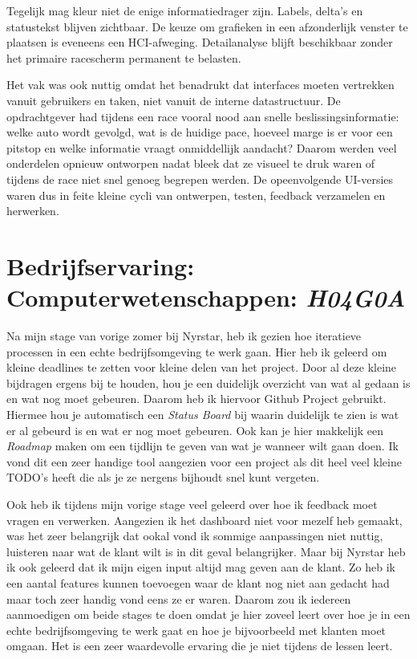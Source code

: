 Tegelijk mag kleur niet de enige informatiedrager zijn. Labels, delta's en statustekst blijven
zichtbaar. De keuze om grafieken in een afzonderlijk venster te plaatsen is eveneens een
HCI-afweging. Detailanalyse blijft beschikbaar zonder het primaire racescherm permanent te belasten.

Het vak was ook nuttig omdat het benadrukt dat interfaces moeten vertrekken vanuit gebruikers en
taken, niet vanuit de interne datastructuur. De opdrachtgever had tijdens een race vooral nood aan
snelle beslissingsinformatie: welke auto wordt gevolgd, wat is de huidige pace, hoeveel marge is er
voor een pitstop en welke informatie vraagt onmiddellijk aandacht? Daarom werden veel onderdelen
opnieuw ontworpen nadat bleek dat ze visueel te druk waren of tijdens de race niet snel genoeg
begrepen werden. De opeenvolgende UI-versies waren dus in feite kleine cycli van ontwerpen, testen,
feedback verzamelen en herwerken.


\section{Bedrijfservaring: Computerwetenschappen: \emph{H04G0A}}
Na mijn stage van vorige zomer bij Nyrstar, heb ik gezien hoe iteratieve processen in een echte bedrijfsomgeving te werk gaan. Hier heb ik geleerd om kleine deadlines te zetten voor kleine delen van het project. Door al deze kleine bijdragen ergens bij te houden, hou je een duidelijk overzicht van wat al gedaan is en wat nog moet gebeuren. Daarom heb ik hiervoor Github Project gebruikt. Hiermee hou je automatisch een \textit{Status Board} bij waarin duidelijk te zien is wat er al gebeurd is en wat er nog moet gebeuren. Ook kan je hier makkelijk een \textit{Roadmap} maken om een tijdlijn te geven van wat je wanneer wilt gaan doen. Ik vond dit een zeer handige tool aangezien voor een project als dit heel veel kleine TODO's heeft die als je ze nergens bijhoudt snel kunt vergeten.

Ook heb ik tijdens mijn vorige stage veel geleerd over hoe ik feedback moet vragen en verwerken. Aangezien ik het dashboard niet voor mezelf heb gemaakt, was het zeer belangrijk dat ookal vond ik sommige aanpassingen niet nuttig, luisteren naar wat de klant wilt is in dit geval belangrijker. Maar bij Nyrstar heb ik ook geleerd dat ik mijn eigen input altijd mag geven aan de klant. Zo heb ik een aantal features kunnen toevoegen waar de klant nog niet aan gedacht had maar toch zeer handig vond eens ze er waren. Daarom zou ik iedereen aanmoedigen om beide stages te doen omdat je hier zoveel leert over hoe je in een echte bedrijfsomgeving te werk gaat en hoe je bijvoorbeeld met klanten moet omgaan. Het is een zeer waardevolle ervaring die je niet tijdens de lessen leert.
